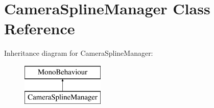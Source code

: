 \hypertarget{class_camera_spline_manager}{}\section{Camera\+Spline\+Manager Class Reference}
\label{class_camera_spline_manager}
Inheritance diagram for Camera\+Spline\+Manager\+:\begin{figure}[H]
\begin{center}
\leavevmode
\includegraphics[height=2.000000cm]{class_camera_spline_manager}
\end{center}
\end{figure}
